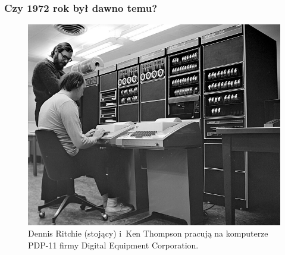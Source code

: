 \documentclass[10pt,t]{beamer}
\begin{document}
\begin{frame}
  \frametitle{Czy 1972 rok był dawno temu?}


    \begin{figure}

    \centering


    \includegraphics[scale=0.3]
    {./Presentations-pictures/Meeting-01/Dennis-Ritchie-Ken-Thompson-PDP-11.jpg}

    \caption{Dennis Ritchie (stojący) i~Ken Thompson pracują na komputerze
      PDP-11 firmy Digital Equipment Corporation.}

    \label{fig:Ritchie-Thompson-PDP-11}

  \end{figure}

\end{frame}
\end{document}
